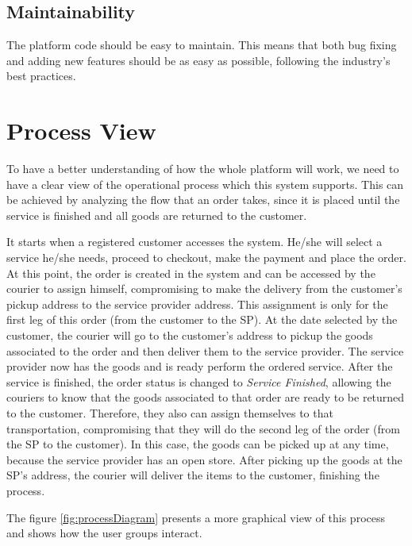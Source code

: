 \subsection{Maintainability}
The platform code should be easy to maintain. This means that both bug fixing and adding new features should be as easy as possible, following the industry's best practices.

\section{Process View}
To have a better understanding of how the whole platform will work, we need to have a clear view of the operational process which this system supports. This can be achieved by analyzing the flow that an order takes, since it is placed until the service is finished and all goods are returned to the customer.
\par
It starts when a registered customer accesses the system. He/she will select a service he/she needs, proceed to checkout, make the payment and place the order. At this point, the order is created in the system and can be accessed by the courier to assign himself, compromising to make the delivery from the customer's pickup address to the service provider address. This assignment is only for the first leg of this order (from the customer to the \gls{SP}). At the date selected by the customer, the courier will go to the customer's address to pickup the goods associated to the order and then deliver them to the service provider. The service provider now has the goods and is ready perform the ordered service. After the service is finished, the order status is changed to \textit{Service Finished}, allowing the couriers to know that the goods associated to that order are ready to be returned to the customer. Therefore, they also can assign themselves to that transportation, compromising that they will do the second leg of the order (from the \gls{SP} to the customer). In this case, the goods can be picked up at any time, because the service provider has an open store. After picking up the goods at the \gls{SP}'s address, the courier will deliver the items to the customer, finishing the process.
\par

The figure \ref{fig:processDiagram} presents a more graphical view of this process and shows how the user groups interact.

